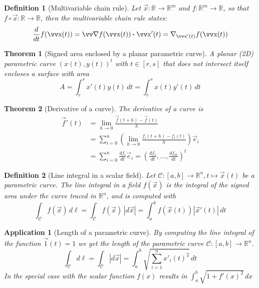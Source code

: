\documentclass[twocolumn, margin=normal]{tex/hsrzf}
\theoremstyle{fuvarzf}
\newtheorem{theorem}{Theorem}
\newtheorem{application}{Application}
\newtheorem{definition}{Definition}
\begin{document}
\begin{definition}[Multivariable chain rule]
  Let \(\vec{x}: \mathbb{R} \to \mathbb{R}^m\) and \(f: \mathbb{R}^m \to
  \mathbb{R}\), so that \(f\circ\vec{x}: \mathbb{R} \to \mathbb{R}\), then
  the multivariable chain rule states:
  \[
    \frac{d}{dt}f(\vec{x}(t)) = \grad f (\vec{x}(t)) \dotp \vec{x}'(t)
      = \nabla_{\vec{x}'(t)} f(\vec{x}(t))
  \]
\end{definition}

\begin{theorem}[Signed area enclosed by a planar parametric curve]
  A planar (2D) parametric curve \((x(t), y(t))^t\) with \(t\in[r,s]\) that does
  not intersect itself encloses a surface with area
  \[
    A = \int_r^s x'(t)y(t) \,dt
      = \int_r^s x(t)y'(t) \,dt
  \]
\end{theorem}

\begin{theorem}[Derivative of a curve]
  The derivative of a curve is
  \begin{align*}
    \vec{f}'(t) &= \lim_{h\to 0} \frac{\vec{f}(t + h) - \vec{f}(t)}{h} \\
    &= \sum_{i=0}^n \left(\lim_{h\to 0} \frac{f_i(t+h) - f_i(t)}{h}\right) \vec{e}_i \\
    &= \sum_{i=0}^n \frac{df_i}{dt}\vec{e}_i
    = \left(\frac{df_1}{dt}, \ldots, \frac{df_m}{dt}\right)^t
  \end{align*}
\end{theorem}

\begin{definition}[Line integral in a scalar field]
  Let \(\mathcal{C}:[a,b]\to\mathbb{R}^n, t \mapsto \vec{x}(t)\) be a
  parametric curve. The \emph{line integral} in a field \(f(\vec{x})\) is the
  integral of the signed area under the curve traced in \(\mathbb{R}^n\), and
  is computed with
  \[
    \int_\mathcal{C} f(\vec{x}) \,d\ell 
    = \int_\mathcal{C} f(\vec{x}) \,|d\vec{x}|
    = \int_a^b f(\vec{x}(t)) |\vec{x}'(t)| \, dt
  \]
\end{definition}

\begin{application}[Length of a parametric curve]
  By computing the line integral of the function \(\vec{1}(t) = 1\) we get the
  length of the parametric curve \(\mathcal{C}:[a,b]\to\mathbb{R}^n\).
  \[
    \int_\mathcal{C}d\ell 
    = \int_\mathcal{C} |d\vec{x}|
    = \int_a^b \sqrt{\sum_{i=1}^n x'_i(t)^2} \,dt
  \]
  In the special case with the scalar function \(f(x)\) results in
  \(\int_a^b\sqrt{1+f'(x)^2}\,dx\)
\end{application}
\end{document}
